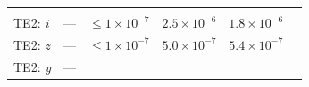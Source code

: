 \documentclass[DM,toc]{lsstdoc}
\begin{document}
\begin{longtable}[]{@{}llllll@{}}
\begin{minipage}[t]{0.17\columnwidth}
\strut
\end{minipage}\tabularnewline
\begin{minipage}[t]{0.12\columnwidth}\raggedright\strut
TE2: \emph{i}\strut
\end{minipage} & \begin{minipage}[t]{0.06\columnwidth}\raggedright\strut
---\strut
\end{minipage} & \begin{minipage}[t]{0.14\columnwidth}\raggedright\strut
\(\leq 1\times10^{-7}\)\strut
\end{minipage} & \begin{minipage}[t]{0.12\columnwidth}\raggedright\strut
\(2.5\times10^{-6}\)\strut
\end{minipage} & \begin{minipage}[t]{0.12\columnwidth}\raggedright\strut
\(1.8\times10^{-6}\)\strut
\end{minipage} & \begin{minipage}[t]{0.17\columnwidth}\raggedright\strut
\strut
\end{minipage}\tabularnewline
\begin{minipage}[t]{0.12\columnwidth}\raggedright\strut
TE2: \emph{z}\strut
\end{minipage} & \begin{minipage}[t]{0.06\columnwidth}\raggedright\strut
---\strut
\end{minipage} & \begin{minipage}[t]{0.14\columnwidth}\raggedright\strut
\(\leq 1\times10^{-7}\)\strut
\end{minipage} & \begin{minipage}[t]{0.12\columnwidth}\raggedright\strut
\(5.0\times10^{-7}\)\strut
\end{minipage} & \begin{minipage}[t]{0.12\columnwidth}\raggedright\strut
\(5.4\times10^{-7}\)\strut
\end{minipage} & \begin{minipage}[t]{0.17\columnwidth}\raggedright\strut
\strut
\end{minipage}\tabularnewline
\begin{minipage}[t]{0.12\columnwidth}\raggedright\strut
TE2: \emph{y}\strut
\end{minipage} & \begin{minipage}[t]{0.06\columnwidth}\raggedright\strut
---\strut
\end{minipage} & \begin{minipage}[t]{0.14\columnwidth}\raggedright\strut

\end{minipage}
\end{longtable}
\end{document}
